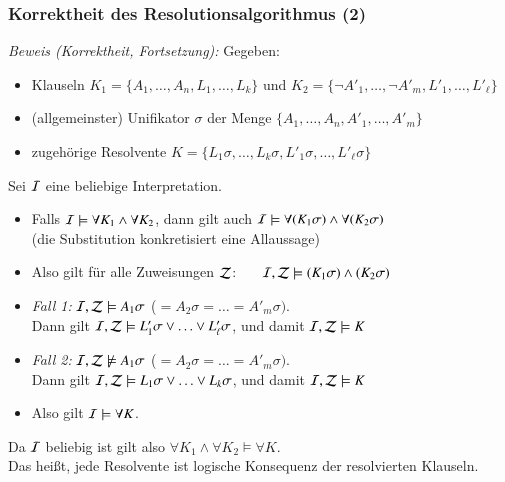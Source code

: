 \documentclass[aspectratio=1610,onlymath]{beamer}
\begin{document}
\begin{frame}\frametitle{Korrektheit des Resolutionsalgorithmus (2)}

\emph{Beweis (Korrektheit, Fortsetzung):} Gegeben:
\begin{itemize}
\item Klauseln $K_1=\{A_1,\ldots,A_n,L_1,\ldots,L_k\}$ und $K_2=\{\neg A'_1,\ldots,\neg A'_m,L'_1,\ldots,L'_\ell\}$
\item (allgemeinster) Unifikator $\sigma$ der Menge $\{A_1,\ldots,A_n,A'_1,\ldots,A'_m\}$
\item zugehörige Resolvente $K=\{L_1\sigma,\ldots,L_k\sigma,L'_1\sigma,\ldots, L'_\ell\sigma\}$\pause
\end{itemize}

Sei $\mathcal{I}$ eine beliebige Interpretation.
\begin{itemize}
\item Falls $\mathcal{I}\models\forall K_1\wedge\forall K_2$, dann gilt auch $\mathcal{I}\models\forall (K_1\sigma)\wedge\forall (K_2\sigma)$\\ (die Substitution konkretisiert eine Allaussage)\pause
\item Also gilt für alle Zuweisungen $\mathcal{Z}$:~~~ $\mathcal{I},\mathcal{Z}\models(K_1\sigma)\wedge (K_2\sigma)$\pause
\item \emph{Fall 1:} $\mathcal{I},\mathcal{Z}\models A_1\sigma$ ($=A_2\sigma=\ldots=A'_m\sigma)$.\\ Dann gilt $\mathcal{I},\mathcal{Z}\models L'_1\sigma\vee\ldots\vee L'_\ell\sigma$, und damit $\mathcal{I},\mathcal{Z}\models K$\pause
\item \emph{Fall 2:} $\mathcal{I},\mathcal{Z}\not\models A_1\sigma$ ($=A_2\sigma=\ldots=A'_m\sigma)$.\\ Dann gilt $\mathcal{I},\mathcal{Z}\models L_1\sigma\vee\ldots\vee L_k\sigma$, und damit $\mathcal{I},\mathcal{Z}\models K$\pause
\item Also gilt $\mathcal{I}\models\forall K$.
\end{itemize}
Da $\mathcal{I}$ beliebig ist gilt also $\forall K_1\wedge\forall K_2\models \forall K$.\\
Das heißt, jede Resolvente ist logische Konsequenz der resolvierten Klauseln.

\end{frame}
\end{document}
